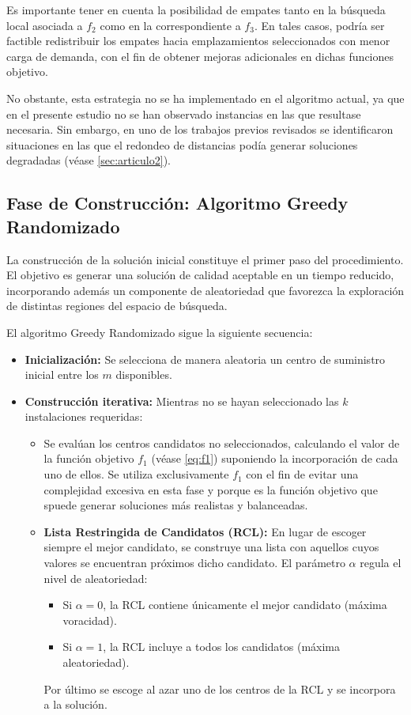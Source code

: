 \documentclass[12pt,a4paper]{book}
\begin{document}
Es importante tener en cuenta la posibilidad de empates tanto en la búsqueda local asociada a $f_2$ como en la correspondiente a $f_3$. En tales casos, podría ser factible redistribuir los empates hacia emplazamientos seleccionados con menor carga de demanda, con el fin de obtener mejoras adicionales en dichas funciones objetivo.  

No obstante, esta estrategia no se ha implementado en el algoritmo actual, ya que en el presente estudio no se han observado instancias en las que resultase necesaria. Sin embargo, en uno de los trabajos previos revisados se identificaron situaciones en las que el redondeo de distancias podía generar soluciones degradadas (véase \ref{sec:articulo2}).  

\subsection{Fase de Construcción: Algoritmo Greedy Randomizado}
La construcción de la solución inicial constituye el primer paso del procedimiento. El objetivo es generar una solución de calidad aceptable en un tiempo reducido, incorporando además un componente de aleatoriedad que favorezca la exploración de distintas regiones del espacio de búsqueda.  

El algoritmo Greedy Randomizado sigue la siguiente secuencia:  

\begin{itemize}
    \item \textbf{Inicialización:} Se selecciona de manera aleatoria un centro de suministro inicial entre los $m$ disponibles.
    \item \textbf{Construcción iterativa:} Mientras no se hayan seleccionado las $k$ instalaciones requeridas:
    \begin{itemize}
        \item Se evalúan los centros candidatos no seleccionados, calculando el valor de la función objetivo $f_1$ (véase \ref{eq:f1}) suponiendo la incorporación de cada uno de ellos. Se utiliza exclusivamente $f_1$ con el fin de evitar una complejidad excesiva en esta fase y porque es la función objetivo que spuede generar soluciones más realistas y balanceadas.
        \item \textbf{Lista Restringida de Candidatos (RCL):} En lugar de escoger siempre el mejor candidato, se construye una lista con aquellos cuyos valores se encuentran próximos dicho candidato. El parámetro $\alpha$ regula el nivel de aleatoriedad:
        \begin{itemize}
            \item Si $\alpha = 0$, la RCL contiene únicamente el mejor candidato (máxima voracidad).
            \item Si $\alpha = 1$, la RCL incluye a todos los candidatos (máxima aleatoriedad).
        \end{itemize}
        Por último se escoge al azar uno de los centros de la RCL y se incorpora a la solución.
    \end{itemize}
\end{itemize}
\end{document}
